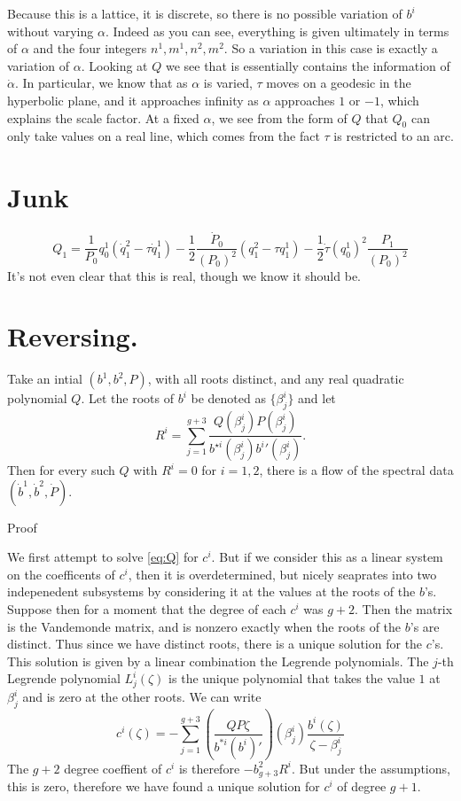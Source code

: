 \documentclass{article}
\begin{document}
Because this is a lattice, it is discrete, so there is no possible variation of $b^i$ without varying $\alpha$. Indeed as you can see, everything is given ultimately in terms of $\alpha$ and the four integers $n^1,m^1,n^2,m^2$. So a variation in this case is exactly a variation of $\alpha$. Looking at $Q$ we see that is essentially contains the information of $\dot\alpha$. In particular, we know that as $\alpha$ is varied, $\tau$ moves on a geodesic in the hyperbolic plane, and it approaches infinity as $\alpha$ approaches $1$ or $-1$, which explains the scale factor. At a fixed $\alpha$, we see from the form of $Q$ that $Q_0$ can only take values on a real line, which comes from the fact $\tau$ is restricted to an arc.

\section{Junk} %
\label{sec:junk}
\[
Q_1 = \frac{1}{P_0}q^1_0(\dot q^2_1 - \tau \dot q^1_1)
-\frac{1}{2}\frac{\dot P_0}{(P_0)^2}(q^2_1 - \tau q^1_1)
-\frac{1}{2}\dot\tau(q^1_0)^2\frac{P_1}{(P_0)^2}
\]
It's not even clear that this is real, though we know it should be.

\section{Reversing.}
Take an intial $(b^1,b^2,P)$, with all roots distinct, and any real quadratic polynomial $Q$. Let the roots of $b^i$ be denoted as $\{\beta^i_j\}$ and let
\[
R^i = \sum_{j=1}^{g+3} \frac{Q(\beta^i_j) P(\beta^i_j)}{b^{\star i}(\beta^i_j) {b^i}'(\beta^i_j)}.
\]
Then for every such $Q$ with $R^i = 0$ for $i=1,2$, there is a flow of the spectral data $(\dot b^1, \dot b^2, \dot P)$.

Proof

We first attempt to solve \eqref{eq:Q} for $c^i$. But if we consider this as a linear system on the coefficents of $c^i$, then it is overdetermined, but nicely seaprates into two indepenedent subsystems by considering it at the values at the roots of the $b$'s. Suppose then for a moment that the degree of each $c^i$ was $g+2$. Then the matrix is the Vandemonde matrix, and is nonzero exactly when the roots of the $b$'s are distinct. Thus since we have distinct roots, there is a unique solution for the $c$'s. This solution is given by a linear combination the Legrende polynomials. The $j$-th Legrende polynomial $L^i_j(\zeta)$ is the unique polynomial that takes the value $1$ at $\beta^i_j$ and is zero at the other roots. We can write
\[
c^i(\zeta) = - \sum_{j=1}^{g+3} \left( \frac{QP\zeta}{b^{*i}(b^i)'}\right)(\beta^i_j) \frac{b^i(\zeta)}{\zeta-\beta^i_j}
\]
The $g+2$ degree coeffient of $c^i$ is therefore $-b^2_{g+3}R^i$. But under the assumptions, this is zero, therefore we have found a unique solution for $c^i$ of degree $g+1$.
\end{document}
